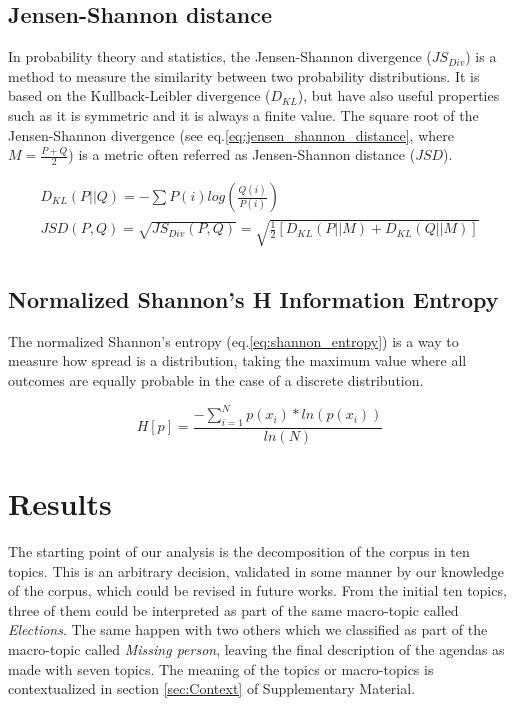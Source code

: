 \documentclass[a4paper, 12pt]{article}
\begin{document}
\subsection{Jensen-Shannon distance}

\par In probability theory and statistics, the Jensen-Shannon divergence ($JS_{Div}$) is a method to measure the similarity between two probability distributions. It is based on the Kullback-Leibler divergence ($D_{KL}$), but have also useful properties such as it is symmetric and it is always a finite value. The square root of the Jensen-Shannon divergence (see eq.\ref{eq:jensen_shannon_distance}, where $M = \frac{P + Q}{2}$) is a metric \cite{fuglede2004jensen} often referred as Jensen-Shannon distance ($JSD$).

\begin{equation}
\begin{split}
D_{KL}(P||Q) = -\sum{P(i) log(\frac{Q(i)}{P(i)})} \\
JSD(P,Q) = \sqrt{JS_{Div}(P,Q)} = \sqrt{\frac{1}{2}[D_{KL}(P||M) + D_{KL}(Q||M)] } \\
\end{split}
\label{eq:jensen_shannon_distance}
\end{equation}


\subsection{Normalized Shannon's H Information Entropy}

\par The normalized Shannon's entropy (eq.\ref{eq:shannon_entropy}) is a way to measure how spread is a distribution, taking the maximum value where all outcomes are equally probable in the case of a discrete distribution.

\begin{equation}
H[p] = \frac{- \sum_{i = 1}^{N} p(x_i) * ln(p(x_i))}{ln(N)}
\label{eq:shannon_entropy}
\end{equation}

\section{Results}

\par The starting point of our analysis is the decomposition of the corpus in ten topics. This is an arbitrary decision, validated in some manner by our knowledge of the corpus, which could be revised in future works.  From the initial ten topics, three of them could be interpreted as part of the same macro-topic called \emph{Elections}. The same happen with two others which we classified as part of the macro-topic called \emph{Missing person}, leaving the  final description of the agendas as made with seven topics. The meaning of the topics or macro-topics is contextualized in section \ref{sec:Context} of Supplementary Material. 
\end{document}
